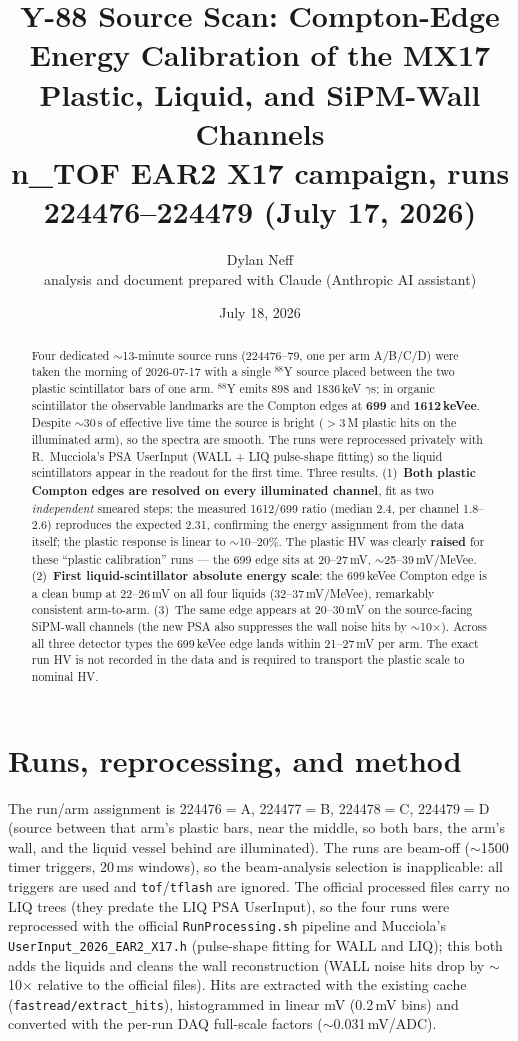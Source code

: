 \documentclass[11pt]{article}
\title{Y-88 Source Scan: Compton-Edge Energy Calibration of the MX17
       Plastic, Liquid, and SiPM-Wall Channels\\
       \large n\_TOF EAR2 X17 campaign, runs 224476--224479 (July 17, 2026)}
\author{Dylan Neff \\[0.5ex] {\small analysis and document prepared with Claude (Anthropic AI assistant)}}
\date{July 18, 2026}
\begin{document}
\maketitle

\begin{abstract}
Four dedicated $\sim$13-minute source runs (224476--79, one per arm A/B/C/D)
were taken the morning of 2026-07-17 with a single $^{88}$Y source placed
between the two plastic scintillator bars of one arm. $^{88}$Y emits 898 and
1836\,keV $\gamma$s; in organic scintillator the observable landmarks are the
Compton edges at \textbf{699} and \textbf{1612\,keVee}. Despite $\sim$30\,s of
effective live time the source is bright ($>$3\,M plastic hits on the
illuminated arm), so the spectra are smooth. The runs were reprocessed
privately with R.~Mucciola's PSA UserInput (WALL + LIQ pulse-shape fitting) so
the liquid scintillators appear in the readout for the first time. Three
results. (1)~\textbf{Both plastic Compton edges are resolved on every
illuminated channel}, fit as two \emph{independent} smeared steps: the measured
1612/699 ratio (median 2.4, per channel 1.8--2.6) reproduces the expected 2.31,
confirming the energy assignment from the data itself; the plastic response is
linear to $\sim$10--20\%. The plastic HV was clearly \textbf{raised} for these
``plastic calibration'' runs --- the 699 edge sits at 20--27\,mV,
$\sim$25--39\,mV/MeVee. (2)~\textbf{First liquid-scintillator absolute energy
scale}: the 699\,keVee Compton edge is a clean bump at 22--26\,mV on all four
liquids (32--37\,mV/MeVee), remarkably consistent arm-to-arm. (3)~The same edge
appears at 20--30\,mV on the source-facing SiPM-wall channels (the new PSA also
suppresses the wall noise hits by $\sim$10$\times$). Across all three detector
types the 699\,keVee edge lands within 21--27\,mV per arm. The exact run HV is
not recorded in the data and is required to transport the plastic scale to
nominal HV.
\end{abstract}

\section{Runs, reprocessing, and method}
The run/arm assignment is 224476$=$A, 224477$=$B, 224478$=$C, 224479$=$D
(source between that arm's plastic bars, near the middle, so both bars, the
arm's wall, and the liquid vessel behind are illuminated). The runs are
beam-off ($\sim$1500 timer triggers, 20\,ms windows), so the beam-analysis
selection is inapplicable: all triggers are used and \texttt{tof}/\texttt{tflash}
are ignored. The official processed files carry no LIQ trees (they predate the
LIQ PSA UserInput), so the four runs were reprocessed with the official
\texttt{RunProcessing.sh} pipeline and Mucciola's
\texttt{UserInput\_2026\_EAR2\_X17.h} (pulse-shape fitting for WALL and LIQ);
this both adds the liquids and cleans the wall reconstruction (WALL noise hits
drop by $\sim$10$\times$ relative to the official files). Hits are extracted
with the existing cache (\texttt{fastread/extract\_hits}), histogrammed in
linear mV (0.2\,mV bins) and converted with the per-run DAQ full-scale factors
($\sim$0.031\,mV/ADC).
\end{document}
